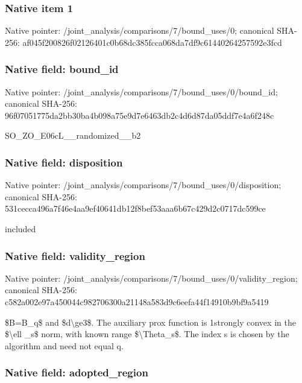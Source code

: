 \documentclass[10pt,a4paper]{article}
\begin{document}
\subsubsection{Native item 1}


Native pointer: /joint\_analysis/comparis\allowbreak{}ons/7/bound\_uses/0; canonical SHA-256: af045f200826f02126401c0b\allowbreak{}68dc385fcca068da7df9c614\allowbreak{}40264257592e3fcd



\subsubsection{Native field: bound\_id}


Native pointer: /joint\_analysis/comparis\allowbreak{}ons/7/bound\_uses/0/bound\allowbreak{}\_id; canonical SHA-256: 96f07051775da2bb30ba4b09\allowbreak{}8a75e9d7e6463db2c4d6d87d\allowbreak{}a05ddf7e4a6f248c


SO\_ZO\_E06cL\_\_randomized\_\_b2


\subsubsection{Native field: disposition}


Native pointer: /joint\_analysis/comparis\allowbreak{}ons/7/bound\_uses/0/dispo\allowbreak{}sition; canonical SHA-256: 531cecca496a7f46e4aa9ef4\allowbreak{}0641db12f8bef53aaa6b67c4\allowbreak{}29d2c0717dc599ce


included


\subsubsection{Native field: validity\_region}


Native pointer: /joint\_analysis/comparis\allowbreak{}ons/7/bound\_uses/0/valid\allowbreak{}ity\_region; canonical SHA-256: c582a002e97a450044c98270\allowbreak{}6300a21148a583d9c6eefa44\allowbreak{}f14910b9bf9a5419


\$B=B\_q\$ and \$d\textbackslash{}ge3\$. The auxiliary prox function is 1strongly convex in the \$\textbackslash{}ell \_s\$ norm, with known range \$\textbackslash{}Theta\_s\$. The index s is chosen by the algorithm and need not equal q.


\subsubsection{Native field: adopted\_region}
\end{document}
